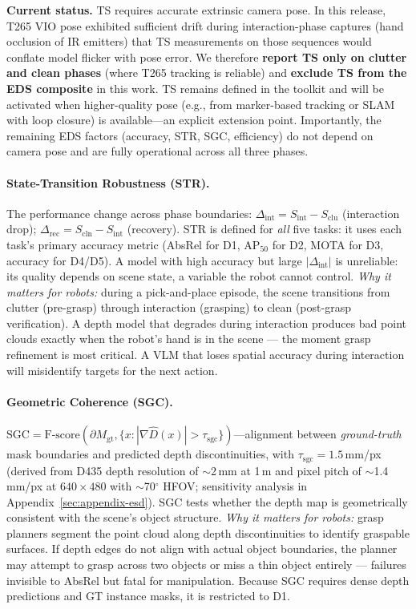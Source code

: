 \textbf{Current status.}
TS requires accurate extrinsic camera pose.
In this release, T265 VIO pose exhibited sufficient drift during interaction-phase captures (hand occlusion of IR emitters) that TS measurements on those sequences would conflate model flicker with pose error.
We therefore \textbf{report TS only on clutter and clean phases} (where T265 tracking is reliable) and \textbf{exclude TS from the EDS composite} in this work.
TS remains defined in the toolkit and will be activated when higher-quality pose (e.g., from marker-based tracking or SLAM with loop closure) is available---an explicit extension point.
Importantly, the remaining EDS factors (accuracy, STR, SGC, efficiency) do not depend on camera pose and are fully operational across all three phases.

\paragraph{State-Transition Robustness (STR).}
The performance change across phase boundaries:
$\Delta_{\text{int}} = S_{\text{int}} - S_{\text{clu}}$ (interaction drop);
$\Delta_{\text{rec}} = S_{\text{cln}} - S_{\text{int}}$ (recovery).
STR is defined for \textit{all} five tasks: it uses each task's primary accuracy metric (AbsRel for D1, AP$_{50}$ for D2, MOTA for D3, accuracy for D4/D5).
A model with high accuracy but large $|\Delta_{\text{int}}|$ is unreliable: its quality depends on scene state, a variable the robot cannot control.
\textit{Why it matters for robots:} during a pick-and-place episode, the scene transitions from clutter (pre-grasp) through interaction (grasping) to clean (post-grasp verification). A depth model that degrades during interaction produces bad point clouds exactly when the robot's hand is in the scene --- the moment grasp refinement is most critical. A VLM that loses spatial accuracy during interaction will misidentify targets for the next action.

\paragraph{Geometric Coherence (SGC).}
$\text{SGC} = \text{F-score}(\partial M_{\text{gt}}, \{x : |\nabla \hat{D}(x)| > \tau_{\text{sgc}}\})$---alignment between \textit{ground-truth} mask boundaries and predicted depth discontinuities, with $\tau_{\text{sgc}} = 1.5$\,mm/px (derived from D435 depth resolution of $\sim$2\,mm at 1\,m and pixel pitch of $\sim$1.4\,mm/px at $640\!\times\!480$ with $\sim$70$^\circ$ HFOV; sensitivity analysis in Appendix~\ref{sec:appendix-esd}).
SGC tests whether the depth map is geometrically consistent with the scene's object structure.
\textit{Why it matters for robots:} grasp planners segment the point cloud along depth discontinuities to identify graspable surfaces. If depth edges do not align with actual object boundaries, the planner may attempt to grasp across two objects or miss a thin object entirely --- failures invisible to AbsRel but fatal for manipulation.
Because SGC requires dense depth predictions and GT instance masks, it is restricted to D1.

